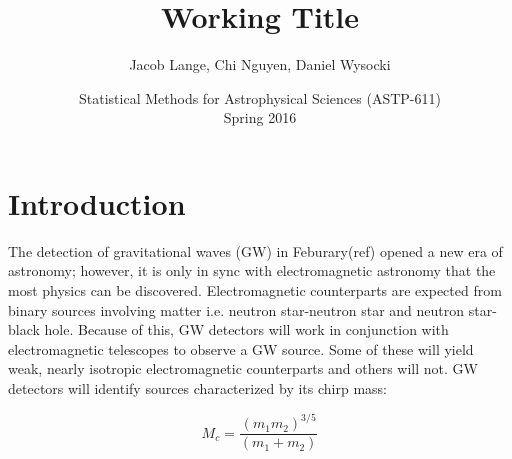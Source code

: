 \documentclass[12pt]{article}
\title{
  Working Title
}
\author{
  Jacob Lange, Chi Nguyen, Daniel Wysocki
}
\date{
  Statistical Methods for Astrophysical Sciences (ASTP-611)
  \\
  Spring 2016
}
\begin{document}
\maketitle


\begin{abstract}


\end{abstract}

\section{Introduction}
\label{sec:intro}
The detection of gravitational waves (GW) in Feburary(ref) opened a new era of astronomy; however, it is only in sync with electromagnetic astronomy that the most physics can be discovered. Electromagnetic counterparts are expected from binary sources involving matter i.e. neutron star-neutron star and neutron star-black hole. Because of this, GW detectors will work in conjunction with electromagnetic telescopes to observe a GW source. Some of these will yield weak, nearly isotropic electromagnetic counterparts and others will not. GW detectors will identify sources characterized by its chirp mass:

\begin{equation}
M_{c}=\frac{(m_{1}m_{2})^{3/5}}{(m_{1}+m_{2})}
\end{equation}
\end{document}

